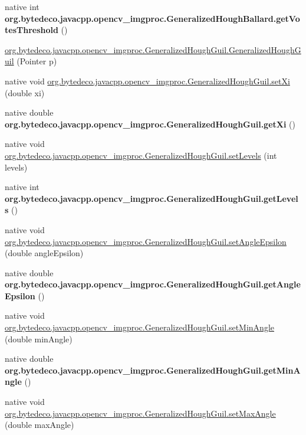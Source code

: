 \begin{DoxyCompactItemize}
native int {\bfseries org.\+bytedeco.\+javacpp.\+opencv\+\_\+imgproc.\+Generalized\+Hough\+Ballard.\+get\+Votes\+Threshold} ()
\item 
\hyperlink{group__imgproc_ga357e428632b56d7aa6e17ea2b77713f5}{org.\+bytedeco.\+javacpp.\+opencv\+\_\+imgproc.\+Generalized\+Hough\+Guil.\+Generalized\+Hough\+Guil} (Pointer p)
\item 
native void \hyperlink{group__imgproc_ga7365e9a7f1eca9a3b2f534a0ac7b78ef}{org.\+bytedeco.\+javacpp.\+opencv\+\_\+imgproc.\+Generalized\+Hough\+Guil.\+set\+Xi} (double xi)
\item 
\mbox{\label{group__imgproc_ga739767da53bf29ade811a768f057175f}} 
native double {\bfseries org.\+bytedeco.\+javacpp.\+opencv\+\_\+imgproc.\+Generalized\+Hough\+Guil.\+get\+Xi} ()
\item 
native void \hyperlink{group__imgproc_ga9eccaeaa69ef94155a2945b8bb409ff4}{org.\+bytedeco.\+javacpp.\+opencv\+\_\+imgproc.\+Generalized\+Hough\+Guil.\+set\+Levels} (int levels)
\item 
\mbox{\label{group__imgproc_ga0c54e00b9a55e7241486315b58cac04d}} 
native int {\bfseries org.\+bytedeco.\+javacpp.\+opencv\+\_\+imgproc.\+Generalized\+Hough\+Guil.\+get\+Levels} ()
\item 
native void \hyperlink{group__imgproc_ga2c1a3aa315145492af4bf215d6180713}{org.\+bytedeco.\+javacpp.\+opencv\+\_\+imgproc.\+Generalized\+Hough\+Guil.\+set\+Angle\+Epsilon} (double angle\+Epsilon)
\item 
\mbox{\label{group__imgproc_ga8da9f73a1509aa11e5c15c17ddf49a04}} 
native double {\bfseries org.\+bytedeco.\+javacpp.\+opencv\+\_\+imgproc.\+Generalized\+Hough\+Guil.\+get\+Angle\+Epsilon} ()
\item 
native void \hyperlink{group__imgproc_ga6d9072493fc3067f7d0cb91678f2d2ad}{org.\+bytedeco.\+javacpp.\+opencv\+\_\+imgproc.\+Generalized\+Hough\+Guil.\+set\+Min\+Angle} (double min\+Angle)
\item 
\mbox{\label{group__imgproc_ga5eb1ad938c0fd856fbba51ee01b60a60}} 
native double {\bfseries org.\+bytedeco.\+javacpp.\+opencv\+\_\+imgproc.\+Generalized\+Hough\+Guil.\+get\+Min\+Angle} ()
\item 
native void \hyperlink{group__imgproc_gafe37f829f70bed0e3ebd23df71dea0f7}{org.\+bytedeco.\+javacpp.\+opencv\+\_\+imgproc.\+Generalized\+Hough\+Guil.\+set\+Max\+Angle} (double max\+Angle)

\end{DoxyCompactItemize}
